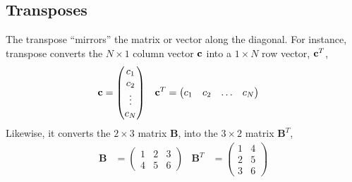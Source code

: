 \documentclass{article}
\newcommand{\B}{\mathbf{B}}
\begin{document}
\subsection{Transposes}
The transpose ``mirrors'' the matrix or vector along the diagonal.
For instance, transpose converts the $N \times 1$ column vector $\mathbf{c}$ into a $1 \times N$ row vector, $\mathbf{c}^T$,
\begin{align}
  \mathbf{c} &= \begin{pmatrix} c_1 \\ c_2 \\ \vdots \\ c_N \end{pmatrix} & 
  \mathbf{c}^T &= \begin{pmatrix} c_1 & c_2 & \hdots & c_N \end{pmatrix}
\end{align}
Likewise, it converts the $2\times 3$ matrix $\B$, into the $3 \times 2$ matrix $\B^T$,
\begin{align}
  \B &= \begin{pmatrix}
    1 & 2 & 3 \\ 
    4 & 5 & 6
  \end{pmatrix} & 
  \B^T &= \begin{pmatrix}
    1 & 4 \\
    2 & 5 \\
    3 & 6
  \end{pmatrix}
\end{align}
\end{document}
